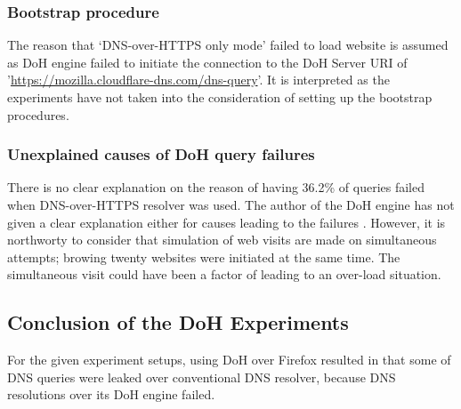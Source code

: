 \subsubsection{Bootstrap procedure}\label{bootstrap}
The reason that `DNS-over-HTTPS only mode' failed to load website is assumed as DoH engine failed to initiate the connection to the DoH Server URI of '\url{https://mozilla.cloudflare-dns.com/dns-query}'. It is interpreted as the experiments have not taken into the consideration of setting up the bootstrap procedures.

\subsubsection{Unexplained causes of DoH query failures}
There is no clear explanation on the reason of having 36.2\% of queries failed when DNS-over-HTTPS resolver was used.
The author of the DoH engine has not given a clear explanation either for causes leading to the failures \cite{daniel-doh}.
However, it is northworty to consider that simulation of web visits are made on simultaneous attempts; browing twenty websites were initiated at the same time.
The simultaneous visit could have been a factor of leading to an over-load situation.

\subsection{Conclusion of the DoH Experiments}
For the given experiment setups, using DoH over Firefox resulted in that some of DNS queries were leaked over conventional DNS resolver, because DNS resolutions over its DoH engine failed.
